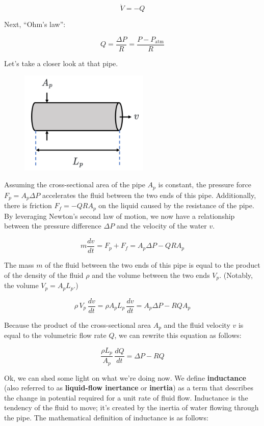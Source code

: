 \documentclass[
  letterpaper,
  DIV=11,
  numbers=noendperiod]{scrreprt}
\begin{document}
\[\dot{V} = -Q\]

Next, ``Ohm's law'':

\[Q = \frac{\Delta P}{R} = \frac{P - P_\text{atm}}{R}\]

Let's take a closer look at that pipe.

\begin{figure}

{\centering \includegraphics[width=0.55\textwidth,height=\textheight]{figs/3_pipe.png}

}

\end{figure}

Assuming the cross-sectional area of the pipe \(A_p\) is constant, the
pressure force \(F_p = A_p \Delta P\) accelerates the fluid between the
two ends of this pipe. Additionally, there is friction \(F_f = -QRA_p\)
on the liquid caused by the resistance of the pipe. By leveraging
Newton's second law of motion, we now have a relationship between the
pressure difference \(\Delta P\) and the velocity of the water \(v\).

\[m \frac{dv}{dt} = F_p + F_f = A_p \Delta P - Q R A_p\]

The mass \(m\) of the fluid between the two ends of this pipe is equal
to the product of the density of the fluid \(\rho\) and the volume
between the two ends \(V_p\). (Notably, the volume \(V_p = A_p L_p\).)

\[\rho \, V_p \, \frac{dv}{dt} = \rho A_p L_p \, \frac{dv}{dt} = A_p \Delta P - RQ A_p\]

Because the product of the cross-sectional area \(A_p\) and the fluid
velocity \(v\) is equal to the volumetric flow rate \(Q\), we can
rewrite this equation as follows:

\[\frac{\rho L_p}{A_p} \, \frac{dQ}{dt} = \Delta P - RQ\]

Ok, we can shed some light on what we're doing now. We define
\textbf{inductance} (also referred to as \textbf{liquid-flow inertance}
or \textbf{inertia}) as a term that describes the change in potential
required for a unit rate of fluid flow. Inductance is the tendency of
the fluid to move; it's created by the inertia of water flowing through
the pipe. The mathematical definition of inductance is as follows:
\end{document}
